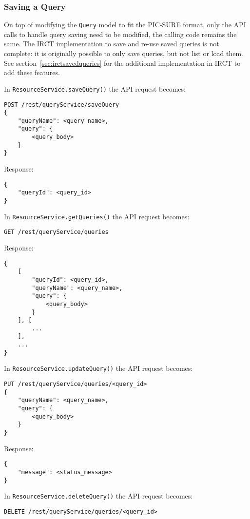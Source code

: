 \subsubsection{Saving a Query}
On top of modifying the \verb|Query| model to fit the PIC-SURE format, only the API calls to handle query saving need to be modified, the calling code remains the same.
The IRCT implementation to save and re-use saved queries is not complete: it is originally possible to only save queries, but not list or load them. 
See section~\ref{sec:irctsavedqueries} for the additional implementation in IRCT to add these features.

In \verb|ResourceService.saveQuery()| the API request becomes:
\begin{verbatim}
POST /rest/queryService/saveQuery
{
    "queryName": <query_name>,
    "query": {
        <query_body>
    }
}    
\end{verbatim}

Response:
\begin{verbatim}
{
    "queryId": <query_id>
}    
\end{verbatim}

In  \verb|ResourceService.getQueries()| the API request becomes:
\begin{verbatim}
GET /rest/queryService/queries
\end{verbatim}

Response:
\begin{verbatim}
{
    [
        "queryId": <query_id>,
        "queryName": <query_name>,
        "query": {
            <query_body>
        }
    ], [
        ...
    ],
    ...
}    
\end{verbatim}

In  \verb|ResourceService.updateQuery()| the API request becomes:
\begin{verbatim}
PUT /rest/queryService/queries/<query_id>
{
    "queryName": <query_name>,
    "query": {
        <query_body>
    }
}
\end{verbatim}

Response:
\begin{verbatim}
{
    "message": <status_message>
} 
\end{verbatim}

In  \verb|ResourceService.deleteQuery()| the API request becomes:
\begin{verbatim}
DELETE /rest/queryService/queries/<query_id>
\end{verbatim}


